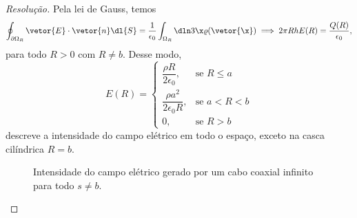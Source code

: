 \begin{proof}[Resolução]
    Pela lei de Gauss, temos
    \begin{equation*}
        \oint_{\partial \Omega_R} \vetor{E}\cdot \vetor{n} \dl{S} = \frac{1}{\epsilon_0} \int_{\Omega_R}\dln3\x \varrho(\vetor{\x}) \implies 2\pi R h E(R) = \frac{Q(R)}{\epsilon_0},
    \end{equation*}
    para todo \(R > 0\) com \(R \neq b\). Desse modo,
    \begin{equation*}
        E(R) = \begin{cases}
            \dfrac{\rho R}{2 \epsilon_0},&\text{se }R \leq a\\
            \dfrac{\rho a^2}{2 \epsilon_0 R}, &\text{se }a < R < b\\
            0,&\text{se }R > b
        \end{cases}
    \end{equation*}
    descreve a intensidade do campo elétrico em todo o espaço, exceto na casca cilíndrica \(R = b\).

    \begin{figure}[!ht]
        \centering
        \caption{Intensidade do campo elétrico gerado por um cabo coaxial infinito para todo \(s \neq b\).}
    \end{figure}


\end{proof}
